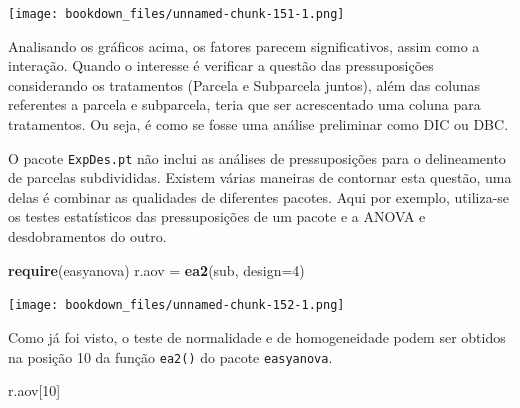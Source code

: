 \documentclass[
]{article}
\newenvironment{Shaded}{\begin{snugshade}}{\end{snugshade}}
\newcommand{\DataTypeTok}[1]{\textcolor[rgb]{0.13,0.29,0.53}{#1}}
\newcommand{\DecValTok}[1]{\textcolor[rgb]{0.00,0.00,0.81}{#1}}
\newcommand{\KeywordTok}[1]{\textcolor[rgb]{0.13,0.29,0.53}{\textbf{#1}}}
\newcommand{\NormalTok}[1]{#1}
\newcommand{\OperatorTok}[1]{\textcolor[rgb]{0.81,0.36,0.00}{\textbf{#1}}}
\newcommand{\StringTok}[1]{\textcolor[rgb]{0.31,0.60,0.02}{#1}}
\begin{document}
\begin{Shaded}
\end{Shaded}

\texttt{[image: bookdown\_files/unnamed-chunk-151-1.png]}

Analisando os gráficos acima, os fatores parecem significativos, assim como a interação. Quando o interesse é verificar a questão das pressuposições considerando os tratamentos (Parcela e Subparcela juntos), além das colunas referentes a parcela e subparcela, teria que ser acrescentado uma coluna para tratamentos. Ou seja, é como se fosse uma análise preliminar como DIC ou DBC.

O pacote \texttt{ExpDes.pt} não inclui as análises de pressuposições para o delineamento de parcelas subdivididas. Existem várias maneiras de contornar esta questão, uma delas é combinar as qualidades de diferentes pacotes. Aqui por exemplo, utiliza-se os testes estatísticos das pressuposições de um pacote e a ANOVA e desdobramentos do outro.

\begin{Shaded}
\begin{Highlighting}[]
\KeywordTok{require}\NormalTok{(easyanova)}
\NormalTok{r.aov =}\StringTok{ }\KeywordTok{ea2}\NormalTok{(sub, }\DataTypeTok{design=}\DecValTok{4}\NormalTok{)}
\end{Highlighting}
\end{Shaded}

\texttt{[image: bookdown\_files/unnamed-chunk-152-1.png]}

Como já foi visto, o teste de normalidade e de homogeneidade podem ser obtidos na posição 10 da função \texttt{ea2()} do pacote \texttt{easyanova}.

\begin{Shaded}
\begin{Highlighting}[]
\NormalTok{r.aov[}\DecValTok{10}\NormalTok{]}
\end{Highlighting}
\end{Shaded}
\end{document}
